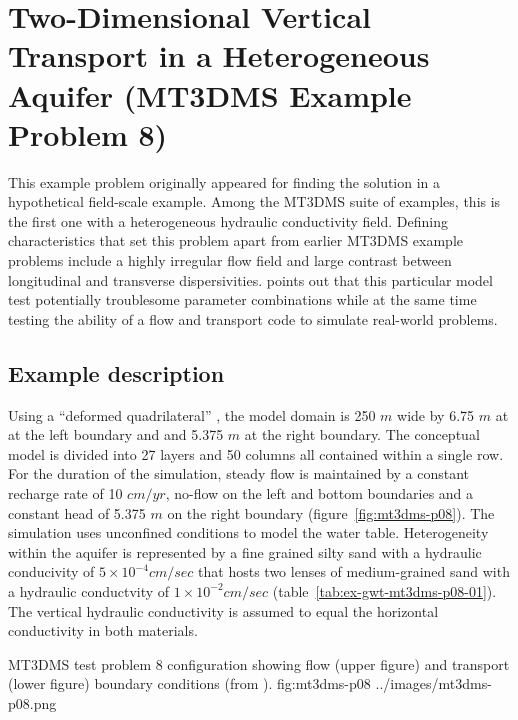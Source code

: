 \section{Two-Dimensional Vertical Transport in a Heterogeneous Aquifer (MT3DMS Example Problem 8)}

This example problem originally appeared \cite{sudicky1989} for finding the solution in a hypothetical field-scale example.  Among the MT3DMS suite of examples, this is the first one with a heterogeneous hydraulic conductivity field.  Defining characteristics that set this problem apart from earlier MT3DMS example problems include a highly irregular flow field and large contrast between longitudinal and transverse dispersivities.  \cite{vanderheijde1995} points out that this particular model test potentially troublesome parameter combinations while at the same time testing the ability of a flow and transport code to simulate real-world problems.

\subsection{Example description}

Using a ``deformed quadrilateral'' \citep{zheng1999mt3dms}, the model domain is 250 $m$ wide by 6.75 $m$ at at the left boundary and and 5.375 $m$ at the right boundary. The conceptual model is divided into 27 layers and 50 columns all contained within a single row.  For the duration of the simulation, steady flow is maintained by a constant recharge rate of 10 $cm/yr$, no-flow on the left and bottom boundaries and a constant head of 5.375 $m$ on the right boundary (figure~\ref{fig:mt3dms-p08}).  The simulation uses unconfined conditions to model the water table.  Heterogeneity within the aquifer is represented by a fine grained silty sand with a hydraulic conducivity of $5 \times 10^{-4} cm/sec$ that hosts two lenses of medium-grained sand with a hydraulic conductvity of $1 \times 10^{-2} cm/sec$ (table~\ref{tab:ex-gwt-mt3dms-p08-01}).  The vertical hydraulic conductivity is assumed to equal the horizontal conductivity in both materials.

\begin{StandardFigure}
	{MT3DMS test problem 8 configuration showing flow (upper figure) and transport (lower figure) boundary conditions (from \cite{sudicky1989}).} 
	{fig:mt3dms-p08}
	{../images/mt3dms-p08.png}
\end{StandardFigure}

